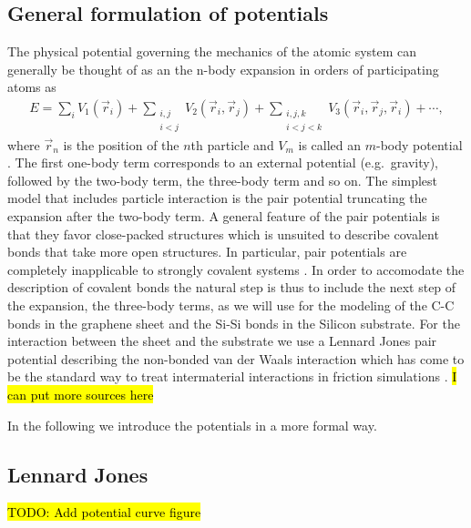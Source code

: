 

\subsection{General formulation of potentials}
The physical potential governing the mechanics of the atomic system can
generally be thought of as an the n-body expansion in orders of participating
atoms as 
\begin{align*}
  E = \sum_i V_1(\vec{r}_i) + 
      \sum_{\substack{i, j \\ i < j}} V_2(\vec{r}_i, \vec{r}_j) +  
      \sum_{\substack{i,j,k \\ i < j < k}} V_3(\vec{r}_i, \vec{r}_j, \vec{r}_i) + \cdots,
\end{align*} 
where $\vec{r}_n$ is the position of the $n$th particle and $V_m$ is called an
$m$-body potential  \cite{PhysRevB.37.6991}. The first one-body term corresponds
to an external potential (e.g.\ gravity), followed by the two-body term, the
three-body term and so on. The simplest model that includes particle interaction
is the pair potential truncating the expansion after the two-body term. A
general feature of the pair potentials is that they favor close-packed
structures which is unsuited to describe covalent bonds that take more open
structures. In particular, pair potentials are completely inapplicable to
strongly covalent systems \cite{PhysRevB.37.6991}. In order to accomodate the
description of covalent bonds the natural step is thus to include the next step
of the expansion, the three-body terms, as we will use for the modeling of the
C-C bonds in the graphene sheet and the Si-Si bonds in the Silicon substrate.
For the interaction between the sheet and the substrate we use a Lennard Jones
pair potential describing the non-bonded van der Waals interaction which has
come to be the standard way to treat intermaterial interactions in friction
simulations \cite{zhu_study_2018, ZHANG201585, Yoon2015MolecularDS,
kim_nano-scale_2009}. 
\hl{I can put more sources here}

In the following we introduce the potentials in a more formal way. 

\subsection{Lennard Jones}
\hl{TODO: Add potential curve figure} \\

